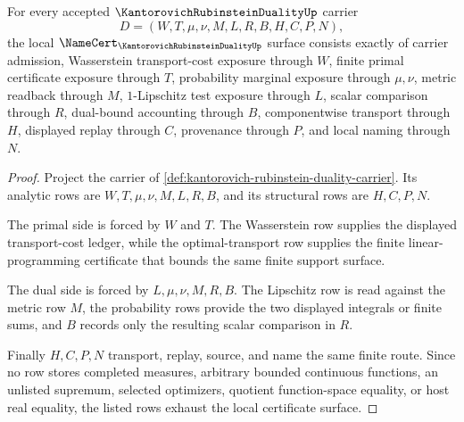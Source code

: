 \begin{theorem}
\label{thm:kantorovich-rubinstein-duality-namecert-obligations}
For every accepted $\KantorovichRubinsteinDualityUp$ carrier
$$
D=(W,T,\mu,\nu,M,L,R,B,H,C,P,N),
$$
the local $\NameCert_{\KantorovichRubinsteinDualityUp}$ surface consists exactly of carrier admission, Wasserstein transport-cost exposure through $W$, finite primal certificate exposure through $T$, probability marginal exposure through $\mu,\nu$, metric readback through $M$, $1$-Lipschitz test exposure through $L$, scalar comparison through $R$, dual-bound accounting through $B$, componentwise transport through $H$, displayed replay through $C$, provenance through $P$, and local naming through $N$.
\end{theorem}
\begin{proof}
Project the carrier of \autoref{def:kantorovich-rubinstein-duality-carrier}. Its analytic rows are $W,T,\mu,\nu,M,L,R,B$, and its structural rows are $H,C,P,N$.

The primal side is forced by $W$ and $T$. The Wasserstein row supplies the displayed transport-cost ledger, while the optimal-transport row supplies the finite linear-programming certificate that bounds the same finite support surface.

The dual side is forced by $L,\mu,\nu,M,R,B$. The Lipschitz row is read against the metric row $M$, the probability rows provide the two displayed integrals or finite sums, and $B$ records only the resulting scalar comparison in $R$.

Finally $H,C,P,N$ transport, replay, source, and name the same finite route. Since no row stores completed measures, arbitrary bounded continuous functions, an unlisted supremum, selected optimizers, quotient function-space equality, or host real equality, the listed rows exhaust the local certificate surface.
\end{proof}

